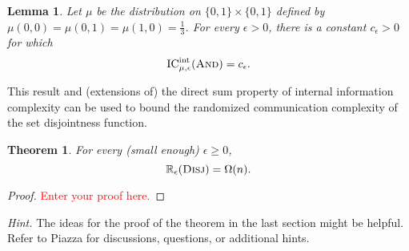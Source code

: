 \documentclass[11pt]{amsart}
\theoremstyle{plain}
\newtheorem{theorem}{Theorem}
\newtheorem{lemma}{Lemma}
\theoremstyle{definition}
\theoremstyle{plain}
\newcommand{\Disj}{\textsc{Disj}}
\newcommand{\ICint}{\mathrm{IC}^{\mathrm{int}}}
\newcommand{\R}{\mathbb{R}}
\newcommand{\replacethistext}[1]{\textcolor{red}{#1}}
\begin{document}
\begin{lemma}
Let $\mu$ be the distribution on $\{0,1\} \times \{0,1\}$ defined by $\mu(0,0) = \mu(0,1) = \mu(1,0) = \frac13$.
For every $\epsilon > 0$, there is a constant $c_\epsilon > 0$ for which
\[
\ICint_{\mu,\epsilon}(\textsc{And}) = c_\epsilon.
\]
\end{lemma}

This result and (extensions of) the direct sum property of internal information complexity can be used to bound the randomized communication complexity of the set disjointness function.

\begin{theorem}
For every (small enough) $\epsilon \ge 0$, 
\[
\R_\epsilon(\Disj) = \Omega(n).
\]
\end{theorem}

\begin{proof}
\replacethistext{Enter your proof here.}
\end{proof}

\bigskip
\noindent \emph{Hint.} The ideas for the proof of the theorem in the last section might be helpful. Refer to Piazza for discussions, questions, or additional hints.
\end{document}
